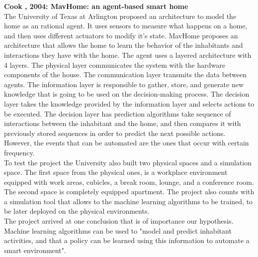 \textbf{Cook \etAl, 2004: MavHome: an agent-based smart home} \cite{1192783} \\
The University of Texas at Arlington proposed an architecture to model the home as an rational agent. It uses sensors to measure what happens on a home, and then uses different actuators to modify it's state. MavHome proposes an architecture that allows the home to learn the behavior of the inhabitants and interactions they have with the home. The agent uses a layered architecture\cite{1192783} with 4 layers. The physical layer communicates the system with the hardware components of the house. The communication layer transmits the data between agents. The information layer is responsible to gather, store, and generate new knowledge that is going to be used on the decision-making process. The decision layer takes the knowledge provided by the information layer and selects actions to be executed. The decision layer has prediction algorithms take sequence of interactions between the inhabitant and the home, and then compares it with previously stored sequences in order to predict the next possible actions. However, the events that can be automated are the ones that occur with certain frequency. \\
To test the project the University also built two physical spaces and a simulation space\cite{inhabitantguidanceofsmartenvironments}. The first space from the physical ones, is a workplace environment equipped with work areas, cubicles, a break room, lounge, and a conference room. The second space is completely equipped apartment. The project also counts with a simulation tool that allows to the machine learning algorithms to be trained, to be later deployed on the physical environments.\\ 
The project arrived at one conclusion that is of importance our hypothesis. Machine learning algorithms can be used to "model and predict inhabitant activities, and that a policy can be learned using this information to automate a smart environment"\cite{inhabitantguidanceofsmartenvironments}.\\

